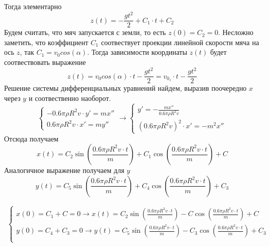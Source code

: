 \documentclass[a5paper, 10pt]{article}
\theoremstyle{definition}
\theoremstyle{plain}
\theoremstyle{remark}
\begin{document}
Тогда элементарно
\begin{equation}
z(t)= - \frac{gt^2}{2}+C_1 \cdot t + C_2
\end{equation}
Будем считать, что мяч запускается с земли, то есть $z(0) = C_2 = 0$. Несложно заметить, что коэффициент $C_1$ соотвествует проекции линейной скорости мяча на ось $z$, так $C_1 = v_0 cos \left( \alpha \right)$. Тогда зависимости координаты $z(t)$ будет соотвествовать выражение 
\begin{equation}
z(t)=  v_0 cos \left( \alpha \right) \cdot t - \frac{gt^2}{2} =  v_{0_z} \cdot t -  \frac{gt^2}{2} 
\end{equation}
Решение системы дифференциальных уравнений найдем, выразив поочередно  $x$ через $y$ и соотвественно наоборот. 
\begin{equation}
\begin{cases}
  - 0.6 \pi \rho  R^{2} v \cdot  y' = m x''\\
    0.6 \pi \rho  R^{2} v  \cdot   x'  = m y''
\end{cases}
\to
\begin{cases}
    y' = - \frac{m x''}{ 0.6 \pi \rho  R^{2} v}\\
    \left(0.6 \pi \rho  R^{2} v \right)^2 \cdot   x'  = -m^2x''
\end{cases}
\end{equation}
Отсюда получаем
\begin{equation}
x(t) = C_2 \sin \left(\frac{0.6 \pi \rho  R^{2} v \cdot t}{m} \right) +  C_1 \cos \left(\frac{0.6 \pi \rho  R^{2} v \cdot t}{m} \right) + C
\end{equation}
Аналогичное выражение получаем для $y$
\begin{equation}
y(t) = C_5 \sin \left(\frac{0.6 \pi \rho  R^{2} v \cdot t}{m} \right) +  C_4 \cos \left(\frac{0.6 \pi \rho  R^{2} v \cdot t}{m} \right) + C_3
\end{equation}

\begin{multline}
\begin{cases}
x(0) =  C_1 + C = 0 \to x(t) = C_2 \sin \left(\frac{0.6 \pi \rho  R^{2} v \cdot t}{m} \right) -  C \cos \left(\frac{0.6 \pi \rho  R^{2} v \cdot t}{m} \right) + C \\
y(0) =  C_4 + C_3 = 0 \to  y(t) = C_5 \sin \left(\frac{0.6 \pi \rho  R^{2} v \cdot t}{m} \right) -  C_3 \cos \left(\frac{0.6 \pi \rho  R^{2} v \cdot t}{m} \right) + C_3\\
\end{cases}
\end{multline}
\end{document}
